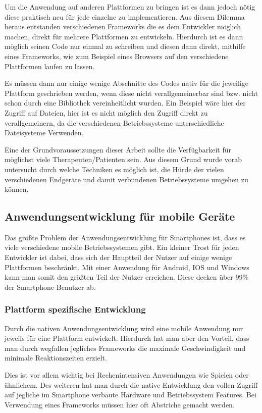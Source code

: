 Um die Anwendung auf anderen Plattformen zu bringen ist es dann jedoch nötig diese praktisch neu für jede einzelne zu implementieren. Aus diesem Dilemma heraus entstanden verschiedenen Frameworks die es dem Entwickler möglich machen, direkt für mehrere Plattformen zu entwickeln. Hierdurch ist es dann möglich seinen Code nur einmal zu schreiben und diesen dann direkt, mithilfe eines Frameworks, wie zum Beispiel eines Browsers auf den verschiedene Plattformen laufen zu lassen.

Es müssen dann nur einige wenige Abschnitte des Codes nativ für die jeweilige Plattform geschrieben werden, wenn diese nicht verallgemeinerbar sind bzw. nicht schon durch eine Bibliothek vereinheitlicht wurden. Ein Beispiel wäre hier der Zugriff auf Dateien, hier ist es nicht möglich den Zugriff direkt zu verallgemeinern, da die verschiedenen Betriebssysteme unterschiedliche Dateisysteme Verwenden.

Eine der Grundvoraussetzungen dieser Arbeit sollte die Verfügbarkeit für möglichst viele Therapeuten/Patienten sein. Aus diesem Grund wurde vorab untersucht durch welche Techniken es möglich ist, die Hürde der vielen verschiedenen Endgeräte und damit verbundenen Betriebssysteme umgehen zu können. 


\subsection{Anwendungsentwicklung für mobile Geräte}\label{MobileAnwedungsentwicklung}
Das größte Problem der Anwendungsentwicklung für Smartphones ist, dass es viele verschiedene mobile Betriebssystemen gibt. Ein kleiner Trost für jeden Entwickler ist dabei, dass sich der Hauptteil der Nutzer auf einige wenige Plattformen beschränkt. Mit einer Anwendung für Android, IOS und Windows kann man somit den größten Teil der Nutzer erreichen. Diese decken über 99\% \cite{STA16} der Smartphone Benutzer ab.

 
\subsubsection{Plattform spezifische Entwicklung}
Durch die nativen Anwendungsentwicklung wird eine mobile Anwendung nur jeweils für eine Plattform entwickelt. Hierdurch hat man aber den Vorteil, dass man durch wegfallen jegliches Frameworks die maximale Geschwindigkeit und minimale Reaktionszeiten erzielt.

Dies ist vor allem wichtig bei Rechenintensiven Anwendungen wie Spielen oder ähnlichem. Des weiteren hat man durch die native Entwicklung den vollen Zugriff auf jegliche im Smartphone verbaute Hardware und Betriebssystem Features. Bei Verwendung eines Frameworks müssen hier oft Abstriche gemacht werden.

